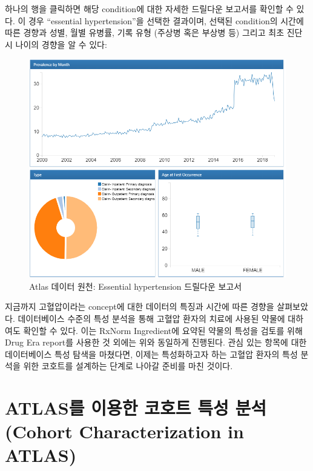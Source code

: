 \documentclass[11pt]{book}
\theoremstyle{definition}
\theoremstyle{definition}
\theoremstyle{definition}
\theoremstyle{remark}
\begin{document}
하나의 행을 클릭하면 해당 condition에 대한 자세한 드릴다운 보고서를
확인할 수 있다. 이 경우 ``essential hypertension''을 선택한 결과이며,
선택된 condition의 시간에 따른 경향과 성별, 월별 유병률, 기록 유형
(주상병 혹은 부상병 등) 그리고 최초 진단 시 나이의 경향을 알 수 있다:

\begin{figure}

{\centering \includegraphics[width=1\linewidth]{images/Characterization/atlasDataSourcesDrillDownReport} 

}

\caption{Atlas 데이터 원천: Essential hypertension 드릴다운 보고서}\label{fig:atlasDataSourcesDrillDownReport}
\end{figure}

지금까지 고혈압이라는 concept에 대한 데이터의 특징과 시간에 따른 경향을
살펴보았다. 데이터베이스 수준의 특성 분석을 통해 고혈압 환자의 치료에
사용된 약물에 대하여도 확인할 수 있다. 이는 RxNorm Ingredient에 요약된
약물의 특성을 검토를 위해 Drug Era report를 사용한 것 외에는 위와
동일하게 진행된다. 관심 있는 항목에 대한 데이터베이스 특성 탐색을
마쳤다면, 이제는 특성화하고자 하는 고혈압 환자의 특성 분석을 위한
코호트를 설계하는 단계로 나아갈 준비를 마친 것이다.

\section{ATLAS를 이용한 코호트 특성 분석 (Cohort Characterization in
ATLAS)}\label{atlas-----cohort-characterization-in-atlas}
\end{document}
